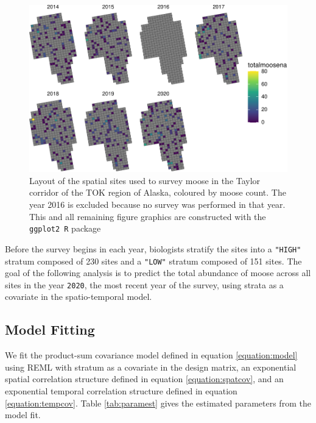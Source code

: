 \documentclass[]{interact}
\theoremstyle{plain}%
\theoremstyle{definition}
\theoremstyle{remark}
\begin{document}
\begin{figure}
\centering
\includegraphics{fpspatiotemp_manu_files/figure-latex/tokplotyears-1.pdf}
\caption{\label{fig:tokplotyears} Layout of the spatial sites used to
survey moose in the Taylor corridor of the TOK region of Alaska,
coloured by moose count. The year 2016 is excluded because no survey was
performed in that year. This and all remaining figure graphics are
constructed with the \texttt{ggplot2 R} package \citep{wickham2016data}}
\end{figure}

Before the survey begins in each year, biologists stratify the sites
into a \texttt{"HIGH"} stratum composed of 230 sites and a
\texttt{"LOW"} stratum composed of 151 sites. The goal of the following
analysis is to predict the total abundance of moose across all sites in
the year \texttt{2020}, the most recent year of the survey, using strata
as a covariate in the spatio-temporal model.

\subsection{Model Fitting} \label{subsection:modelfit}

We fit the product-sum covariance model defined in equation
\ref{equation:model} using REML with stratum as a covariate in the
design matrix, an exponential spatial correlation structure defined in
equation \ref{equation:spatcov}, and an exponential temporal correlation
structure defined in equation \ref{equation:tempcov}. Table
\ref{tab:paramest} gives the estimated parameters from the model fit.
\end{document}
